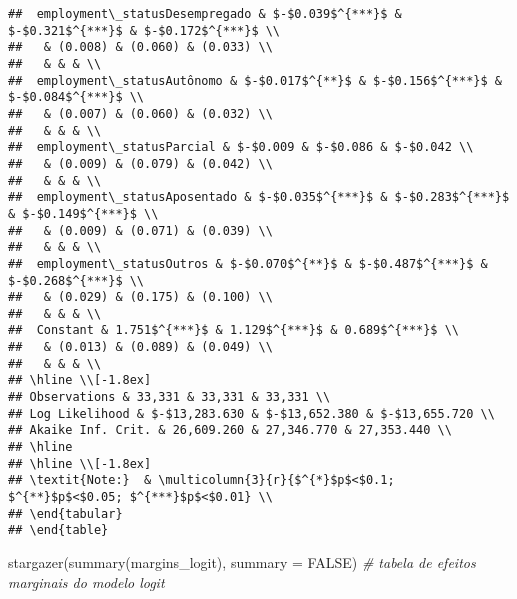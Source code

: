 \documentclass[
]{article}
\newenvironment{Shaded}{\begin{snugshade}}{\end{snugshade}}
\newcommand{\AttributeTok}[1]{\textcolor[rgb]{0.77,0.63,0.00}{#1}}
\newcommand{\CommentTok}[1]{\textcolor[rgb]{0.56,0.35,0.01}{\textit{#1}}}
\newcommand{\ConstantTok}[1]{\textcolor[rgb]{0.00,0.00,0.00}{#1}}
\newcommand{\FunctionTok}[1]{\textcolor[rgb]{0.00,0.00,0.00}{#1}}
\newcommand{\NormalTok}[1]{#1}
\begin{document}
\begin{verbatim}
##  employment\_statusDesempregado & $-$0.039$^{***}$ & $-$0.321$^{***}$ & $-$0.172$^{***}$ \\ 
##   & (0.008) & (0.060) & (0.033) \\ 
##   & & & \\ 
##  employment\_statusAutônomo & $-$0.017$^{**}$ & $-$0.156$^{***}$ & $-$0.084$^{***}$ \\ 
##   & (0.007) & (0.060) & (0.032) \\ 
##   & & & \\ 
##  employment\_statusParcial & $-$0.009 & $-$0.086 & $-$0.042 \\ 
##   & (0.009) & (0.079) & (0.042) \\ 
##   & & & \\ 
##  employment\_statusAposentado & $-$0.035$^{***}$ & $-$0.283$^{***}$ & $-$0.149$^{***}$ \\ 
##   & (0.009) & (0.071) & (0.039) \\ 
##   & & & \\ 
##  employment\_statusOutros & $-$0.070$^{**}$ & $-$0.487$^{***}$ & $-$0.268$^{***}$ \\ 
##   & (0.029) & (0.175) & (0.100) \\ 
##   & & & \\ 
##  Constant & 1.751$^{***}$ & 1.129$^{***}$ & 0.689$^{***}$ \\ 
##   & (0.013) & (0.089) & (0.049) \\ 
##   & & & \\ 
## \hline \\[-1.8ex] 
## Observations & 33,331 & 33,331 & 33,331 \\ 
## Log Likelihood & $-$13,283.630 & $-$13,652.380 & $-$13,655.720 \\ 
## Akaike Inf. Crit. & 26,609.260 & 27,346.770 & 27,353.440 \\ 
## \hline 
## \hline \\[-1.8ex] 
## \textit{Note:}  & \multicolumn{3}{r}{$^{*}$p$<$0.1; $^{**}$p$<$0.05; $^{***}$p$<$0.01} \\ 
## \end{tabular} 
## \end{table}
\end{verbatim}

\begin{Shaded}
\begin{Highlighting}[]
\FunctionTok{stargazer}\NormalTok{(}\FunctionTok{summary}\NormalTok{(margins\_logit), }\AttributeTok{summary =} \ConstantTok{FALSE}\NormalTok{) }\CommentTok{\# tabela de efeitos marginais do modelo logit}
\end{Highlighting}
\end{Shaded}
\end{document}
